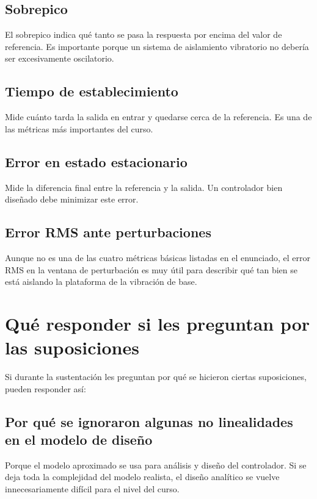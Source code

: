 \documentclass[11pt]{article}
\begin{document}
\subsection{Sobrepico}

El sobrepico indica qu\'e tanto se pasa la respuesta por encima del valor de referencia. Es importante porque un sistema de aislamiento vibratorio no deber\'ia ser excesivamente oscilatorio.

\subsection{Tiempo de establecimiento}

Mide cu\'anto tarda la salida en entrar y quedarse cerca de la referencia. Es una de las m\'etricas m\'as importantes del curso.

\subsection{Error en estado estacionario}

Mide la diferencia final entre la referencia y la salida. Un controlador bien dise\~nado debe minimizar este error.

\subsection{Error RMS ante perturbaciones}

Aunque no es una de las cuatro m\'etricas b\'asicas listadas en el enunciado, el error RMS en la ventana de perturbaci\'on es muy \'util para describir qu\'e tan bien se est\'a aislando la plataforma de la vibraci\'on de base.

\section{Qu\'e responder si les preguntan por las suposiciones}

Si durante la sustentaci\'on les preguntan por qu\'e se hicieron ciertas suposiciones, pueden responder as\'i:

\subsection*{Por qu\'e se ignoraron algunas no linealidades en el modelo de dise\~no}

Porque el modelo aproximado se usa para an\'alisis y dise\~no del controlador. Si se deja toda la complejidad del modelo realista, el dise\~no anal\'itico se vuelve innecesariamente dif\'icil para el nivel del curso.
\end{document}
